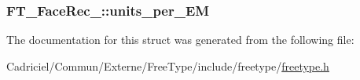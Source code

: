 \hypertarget{struct_f_t___face_rec___a8fde3c2d9b5fab717d8398b4196dd041}{
\subsubsection[{units\-\_\-per\-\_\-\-E\-M}]{ F\-T\-\_\-\-Face\-Rec\-\_\-\-::units\-\_\-per\-\_\-\-E\-M}}\label{struct_f_t___face_rec___a8fde3c2d9b5fab717d8398b4196dd041}


The documentation for this struct was generated from the following file\-:\begin{DoxyCompactItemize}
\item 
Cadriciel/\-Commun/\-Externe/\-Free\-Type/include/freetype/\hyperlink{freetype_8h}{freetype.\-h}\end{DoxyCompactItemize}

